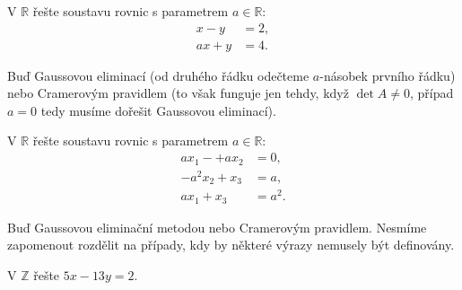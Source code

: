 \begin{priklad}
V $\mathbb R$ řešte soustavu rovnic s parametrem $a \in \mathbb R:$
\begin{align*}
    x-y &=2,\\
    ax+y &=4.
\end{align*}
\end{priklad}

\begin{reseni}
Buď Gaussovou eliminací (od druhého řádku odečteme $a$-násobek prvního řádku) nebo
Cramerovým pravidlem (to však funguje jen tehdy, když $\det A \ne 0$, případ $a=0$ tedy
musíme dořešit Gaussovou eliminací).
\end{reseni}

\begin{priklad}
V $\mathbb R$ řešte soustavu rovnic s parametrem $a\in \mathbb R:$
\begin{align*}
    ax_1-+ax_2 &=0,\\
    -a^2x_2+x_3 &=a,\\
    ax_1 + x_3 &= a^2.
\end{align*}
\end{priklad}

\begin{reseni}
Buď Gaussovou eliminační metodou nebo Cramerovým pravidlem. Nesmíme zapomenout
rozdělit na případy, kdy by některé výrazy nemusely být definovány.
\end{reseni}

\begin{priklad}
V $\mathbb Z$ řešte $5x-13y=2.$
\end{priklad}

